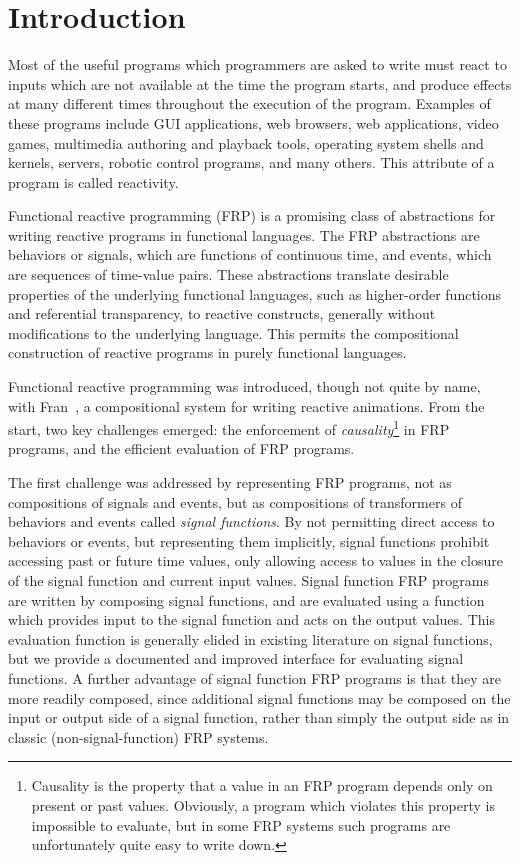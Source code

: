 \chapter{Introduction}
\label{chapter:Introduction}

Most of the useful programs which programmers are asked to write must react to inputs which are not available at the time the program starts,
and produce effects at many different times throughout the execution of the program. Examples of these programs include GUI applications,
web browsers, web applications, video games, multimedia authoring and playback tools, operating system shells and kernels, servers,
robotic control programs, and many others. This attribute of a program is called reactivity.

Functional reactive programming (FRP) is a promising class of abstractions for
writing reactive programs in functional languages. The FRP abstractions are
behaviors or signals, which are functions of continuous time, and events, which
are sequences of time-value pairs. These abstractions translate desirable
properties of the underlying functional languages, such as higher-order
functions and referential transparency, to reactive constructs, generally
without modifications to the underlying language. This permits the compositional
construction of reactive programs in purely functional languages.

Functional reactive programming was introduced, though not quite by name, with Fran~\cite{Elliott1997}, a compositional system for writing
reactive animations. From the start, two key challenges emerged: the enforcement of {\em causality}\footnote{Causality is the property 
that a value in an FRP program depends only on present or past values. Obviously, a program which violates this property is impossible to
evaluate, but in some FRP systems such programs are unfortunately quite easy to write down.} in FRP programs, and the efficient
evaluation of FRP programs.

The first challenge was addressed by representing FRP programs, not as
compositions of signals and events, but as compositions of transformers of
behaviors and events called {\em signal functions}. By not permitting direct
access to behaviors or events, but representing them implicitly, signal
functions prohibit accessing past or future time values, only allowing access to
values in the closure of the signal function and current input values. Signal
function FRP programs are written by composing signal functions, and are
evaluated using a function which provides input to the signal function and acts
on the output values. This evaluation function is generally elided in existing
literature on signal functions, but we provide a documented and improved
interface for evaluating signal functions. A further advantage of signal
function FRP programs is that they are more readily composed, since additional
signal functions may be composed on the input or output side of a signal
function, rather than simply the output side as in classic (non-signal-function)
FRP systems.

